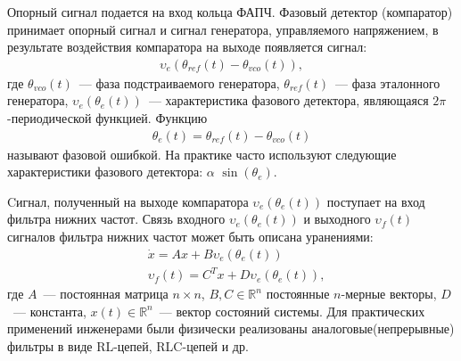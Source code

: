 \documentclass[a4paper,article,14pt]{extarticle}
\begin{document}
Опорный сигнал подается на вход кольца ФАПЧ. Фазовый детектор (компаратор) принимает опорный сигнал и сигнал генератора, управляемого напряжением, в результате воздействия компаратора на выходе появляется сигнал:
 \begin{equation*}
 \begin{aligned}
\upsilon_e(\theta_{ref}(t) - \theta_{vco}(t)),
 \end{aligned}
\end{equation*}
где $\theta_{vco}(t)$~--- фаза подстраиваемого генератора, $\theta_{ref}(t)$~--- фаза эталонного генератора, $\upsilon_e(\theta_e(t))$~--- характеристика фазового детектора, являющаяся $2\pi$-периодической функцией. Функцию
 \begin{equation}\label{phase_error}
 \begin{aligned}
\theta_e(t) = \theta_{ref}(t) - \theta_{vco}(t)
 \end{aligned}
\end{equation}
называют фазовой ошибкой. На практике часто используют следующие характеристики фазового детектора: $\alpha$ $\operatorname{sin}(\theta_e)$.

Cигнал, полученный на выходе компаратора $\upsilon_e(\theta_e(t))$ поступает на вход фильтра нижних частот. Связь входного $\upsilon_e(\theta_e(t))$ и выходного $\upsilon_f(t)$ сигналов фильтра нижних частот может быть описана уранениями:
 \begin{equation}\label{linear_block_eq}
 \begin{aligned}
&\dot{x} = Ax + B\upsilon_e(\theta_e(t))\\
&\upsilon_f(t) = C^Tx + D\upsilon_e(\theta_e(t)),
 \end{aligned}
\end{equation}
где $A$~--- постоянная матрица $n \times n$, $B, C \in \mathbb{R}^n$  постоянные $n$-мерные векторы, $D$~--- константа, $x(t) \in \mathbb{R}^n$~--- вектор состояний системы. Для практических применений инженерами были физически реализованы аналоговые(непрерывные) фильтры в виде RL-цепей, RLC-цепей и др.
\end{document}
